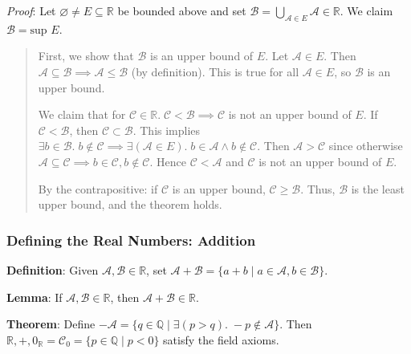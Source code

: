 \documentclass[11pt]{article}
\begin{document}
\emph{Proof}: Let $\varnothing \neq E \subseteq \mathbb{R}$ be bounded above and set $\mathcal{B} = \bigcup_{\mathcal{A} \in E} \mathcal{A} \in \mathbb{R}$. We claim $\mathcal{B} = \text{sup }E$.
\begin{quote}\vspace{-0.3cm}
First, we show that $\mathcal{B}$ is an upper bound of $E$. Let $\mathcal{A} \in E$. Then $\mathcal{A} \subseteq \mathcal{B} \implies \mathcal{A} \leq \mathcal{B}$ (by definition). This is true for all $\mathcal{A} \in E$, so $\mathcal{B}$ is an upper bound.

We claim that for $\mathcal{C} \in \mathbb{R}.\; \mathcal{C} < \mathcal{B} \implies \mathcal{C}$ is not an upper bound of $E$. If $\mathcal{C} < \mathcal{B}$, then $\mathcal{C} \subset \mathcal{B}$. This implies $\exists b \in \mathcal{B}.\; b \notin \mathcal{C} \implies \exists(\mathcal{A} \in E).\; b \in \mathcal{A} \land b \notin \mathcal{C}$. Then $\mathcal{A} > \mathcal{C}$ since otherwise $\mathcal{A} \subseteq \mathcal{C} \implies b \in \mathcal{C}, b \notin \mathcal{C}$. Hence $\mathcal{C} < \mathcal{A}$ and $\mathcal{C}$ is not an upper bound of $E$.

By the contrapositive: if $\mathcal{C}$ is an upper bound, $\mathcal{C} \geq \mathcal{B}$. Thus, $\mathcal{B}$ is the least upper bound, and the theorem holds.
\end{quote}

\subsubsection{Defining the Real Numbers: Addition}

\textbf{Definition}: Given $\mathcal{A}, \mathcal{B} \in \mathbb{R}$, set $\mathcal{A} + \mathcal{B} = \{a+b \;|\; a \in \mathcal{A}, b \in \mathcal{B}\}$.

\textbf{Lemma}: If $\mathcal{A}, \mathcal{B} \in \mathbb{R}$, then $\mathcal{A} + \mathcal{B} \in \mathbb{R}$.

\textbf{Theorem}: Define $-\mathcal{A} = \{q \in \mathbb{Q} \;|\; \exists(p >q).\; -p \notin \mathcal{A}\}$. Then $\mathbb{R}, +, 0_\mathbb{R} = \mathcal{C}_0 = \{p \in \mathbb{Q} \;|\; p < 0\}$ satisfy the field axioms.
\end{document}
